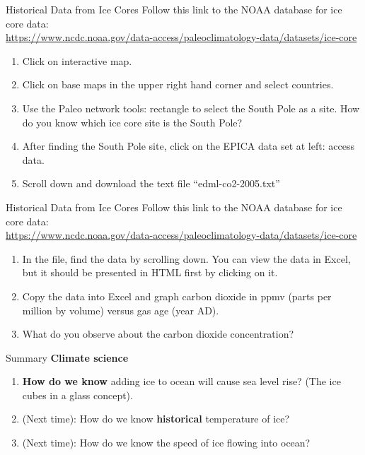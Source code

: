 \documentclass{beamer}
\begin{document}
\begin{frame}{Historical Data from Ice Cores}
Follow this link to the NOAA database for ice core data: \\
\url{https://www.ncdc.noaa.gov/data-access/paleoclimatology-data/datasets/ice-core}
\begin{enumerate}
\item Click on interactive map.
\item Click on base maps in the upper right hand corner and select countries.
\item Use the Paleo network tools: rectangle to select the South Pole as a site.  How do you know which ice core site is the South Pole?
\item After finding the South Pole site, click on the EPICA data set at left: access data.
\item Scroll down and download the text file ``edml-co2-2005.txt''
\end{enumerate}
\end{frame}

\begin{frame}{Historical Data from Ice Cores}
Follow this link to the NOAA database for ice core data: \\
\url{https://www.ncdc.noaa.gov/data-access/paleoclimatology-data/datasets/ice-core}
\begin{enumerate}
\item In the file, find the data by scrolling down.  You can view the data in Excel, but it should be presented in HTML first by clicking on it.
\item Copy the data into Excel and graph carbon dioxide in ppmv (parts per million by volume) versus gas age (year AD).
\item What do you observe about the carbon dioxide concentration?
\end{enumerate}
\end{frame}

\begin{frame}{Summary}
\textbf{Climate science}
\begin{enumerate}
\item \textbf{How do we know} adding ice to ocean will cause sea level rise? (The ice cubes in a glass concept).
\item (Next time): How do we know \textbf{historical} temperature of ice?
\item (Next time): How do we know the speed of ice flowing into ocean?
\end{enumerate}
\end{frame}
\end{document}
